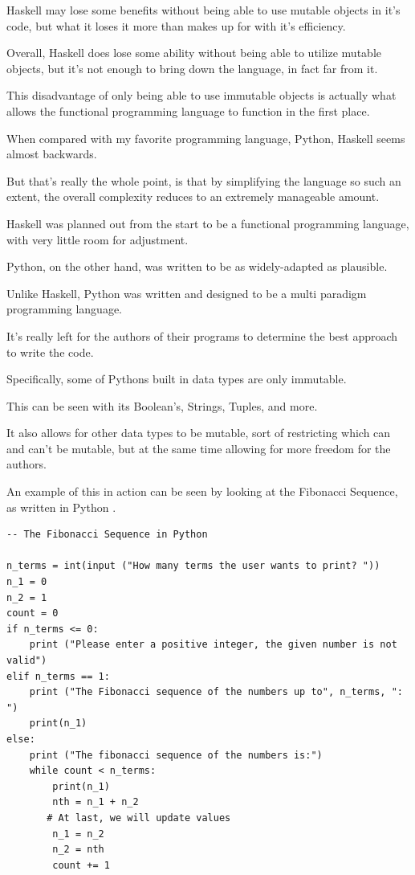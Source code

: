 \documentclass{article}
\begin{document}
\medskip\noindent
Haskell may lose some benefits without being able to use mutable objects in it's code, but what it loses it more than makes up for with it's efficiency. 

\medskip\noindent
Overall, Haskell does lose some ability without being able to utilize mutable objects, but it's not enough to bring down the language, in fact far from it. 

\medskip\noindent
This disadvantage of only being able to use immutable objects is actually what allows the functional programming language to function in the first place.

\medskip\noindent
When compared with my favorite programming language, Python, Haskell seems almost backwards. 

\medskip\noindent
But that's really the whole point, is that by simplifying the language so such an extent, the overall complexity reduces to an extremely manageable amount.  

\medskip\noindent
Haskell was planned out from the start to be a functional programming language, with very little room for adjustment. 

\medskip\noindent
Python, on the other hand, was written to be as widely-adapted as plausible. 

\medskip\noindent
Unlike Haskell, Python was written and designed to be a multi paradigm programming language. 

\medskip\noindent
It's really left for the authors of their programs to determine the best approach to write the code. 

\medskip\noindent
Specifically, \cite{IC} some of Pythons built in data types are only immutable. 

\medskip\noindent
This can be seen with its Boolean's, Strings, Tuples, and more. 

\medskip\noindent
It also allows for other data types to be mutable, sort of restricting which can and can't be mutable, but at the same time allowing for more freedom for the authors.

\medskip\noindent
An example of this in action can be seen by looking at the Fibonacci Sequence, as written in Python \cite{JP}.

\medskip\noindent
\begin{lstlisting}
-- The Fibonacci Sequence in Python

n_terms = int(input ("How many terms the user wants to print? "))  
n_1 = 0  
n_2 = 1  
count = 0  
if n_terms <= 0:  
    print ("Please enter a positive integer, the given number is not valid")  
elif n_terms == 1:  
    print ("The Fibonacci sequence of the numbers up to", n_terms, ": ")  
    print(n_1)  
else:  
    print ("The fibonacci sequence of the numbers is:")  
    while count < n_terms:  
        print(n_1)  
        nth = n_1 + n_2  
       # At last, we will update values  
        n_1 = n_2  
        n_2 = nth  
        count += 1  
\end{lstlisting}
\end{document}
